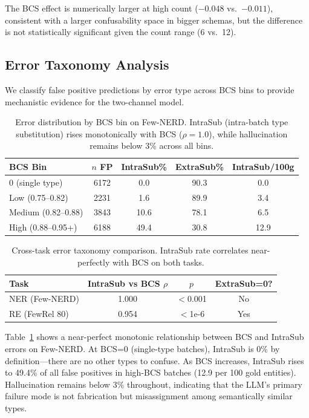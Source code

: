\documentclass[11pt,a4paper]{article}
\begin{document}
The BCS effect is numerically larger at high count ($-0.048$ vs.\ $-0.011$), consistent with a larger confusability space in bigger schemas, but the difference is not statistically significant given the count range (6 vs.\ 12).

\subsection{Error Taxonomy Analysis}
\label{sec:error-taxonomy}

We classify false positive predictions by error type across BCS bins to provide mechanistic evidence for the two-channel model.

\begin{table}[t]
\centering
\small
\begin{tabular}{lcccc}
\toprule
\textbf{BCS Bin} & \textbf{$n$ FP} & \textbf{IntraSub\%} & \textbf{ExtraSub\%} & \textbf{IntraSub/100g} \\
\midrule
0 (single type)       & 6172 & 0.0  & 90.3 & 0.0 \\
Low (0.75--0.82)      & 2231 & 1.6  & 89.9 & 3.4 \\
Medium (0.82--0.88)   & 3843 & 10.6 & 78.1 & 6.5 \\
High (0.88--0.95+)    & 6188 & 49.4 & 30.8 & 12.9 \\
\bottomrule
\end{tabular}
\caption{Error distribution by BCS bin on Few-NERD. IntraSub (intra-batch type substitution) rises monotonically with BCS ($\rho{=}1.0$), while hallucination remains below 3\% across all bins.}
\label{tab:error-taxonomy}
\end{table}

\begin{table}[t]
\centering
\small
\begin{tabular}{lccc}
\toprule
\textbf{Task} & \textbf{IntraSub vs BCS $\rho$} & \textbf{$p$} & \textbf{ExtraSub=0?} \\
\midrule
NER (Few-NERD)   & 1.000 & $<$0.001 & No \\
RE (FewRel 80)   & 0.954 & $<$1e-6  & Yes \\
\bottomrule
\end{tabular}
\caption{Cross-task error taxonomy comparison. IntraSub rate correlates near-perfectly with BCS on both tasks.}
\label{tab:error-cross-task}
\end{table}

Table~\ref{tab:error-taxonomy} shows a near-perfect monotonic relationship between BCS and IntraSub errors on Few-NERD.
At BCS=0 (single-type batches), IntraSub is 0\% by definition---there are no other types to confuse.
As BCS increases, IntraSub rises to 49.4\% of all false positives in high-BCS batches (12.9 per 100 gold entities).
Hallucination remains below 3\% throughout, indicating that the LLM's primary failure mode is not fabrication but misassignment among semantically similar types.
\end{document}
